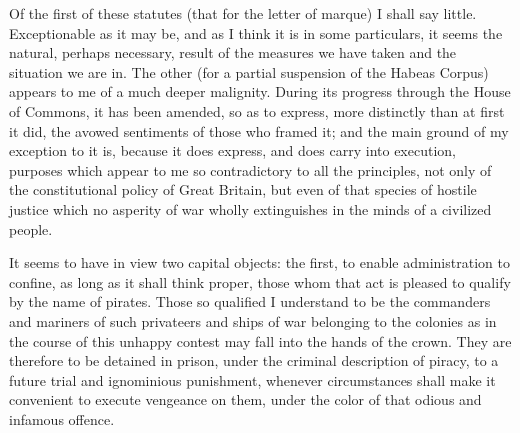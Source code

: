 Of the first of these statutes (that for the letter of marque) I shall say little. Exceptionable as it may be, and as I think it is in some particulars, it seems the natural, perhaps necessary, result of the measures we have taken and the situation we are in. The other (for a partial suspension of the Habeas Corpus) appears to me of a much deeper malignity. During its progress through the House of Commons, it has been amended, so as to express, more distinctly than at first it did, the avowed sentiments of those who framed it; and the main ground of my exception to it is, because it does express, and does carry into execution, purposes which appear to me so contradictory to all the principles, not only of the constitutional policy of Great Britain, but even of that species of hostile justice which no asperity of war wholly extinguishes in the minds of a civilized people.

It seems to have in view two capital objects: the first, to enable administration to confine, as long as it shall think proper, those whom that act is pleased to qualify by the name of pirates. Those so qualified I understand to be the commanders and mariners of such privateers and ships of war belonging to the colonies as in the course of this unhappy contest may fall into the hands of the crown. They are therefore to be detained in prison, under the criminal description of piracy, to a future trial and ignominious punishment, whenever circumstances shall make it convenient to execute vengeance on them, under the color of that odious and infamous offence.


